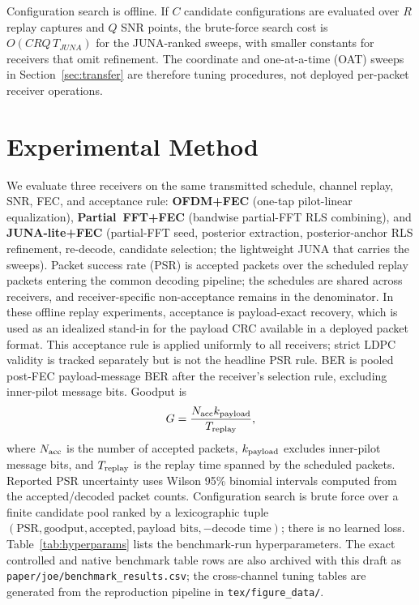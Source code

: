 \documentclass[journal]{IEEEtran}
\newcommand{\juna}{JUNA}
\newcommand{\junalite}{JUNA-lite}
\begin{document}
Configuration search is offline. If $C$ candidate configurations are evaluated
over $R$ replay captures and $Q$ SNR points, the brute-force search cost is
$O(CRQ\,T_{\juna})$ for the JUNA-ranked sweeps, with smaller constants for
receivers that omit refinement. The coordinate and one-at-a-time (OAT) sweeps in
Section~\ref{sec:transfer} are therefore tuning procedures, not deployed
per-packet receiver operations.

\section{Experimental Method}\label{sec:method}
We evaluate three receivers on the same transmitted schedule, channel replay, SNR,
FEC, and acceptance rule: \textbf{OFDM+FEC} (one-tap pilot-linear equalization),
\textbf{Partial~FFT+FEC} (bandwise partial-FFT RLS combining), and
\textbf{\junalite{}+FEC} (partial-FFT seed, posterior extraction,
posterior-anchor RLS refinement, re-decode, candidate selection; the lightweight
\juna{} that carries the sweeps). Packet success rate (PSR) is
accepted packets over the scheduled replay packets entering the common decoding
pipeline; the schedules are shared across receivers, and receiver-specific
non-acceptance remains in the denominator. In these offline replay experiments,
acceptance is payload-exact recovery, which is used as an idealized stand-in for
the payload CRC available in a deployed packet format. This acceptance rule is
applied uniformly to all receivers; strict LDPC validity is tracked separately but
is not the headline PSR rule. BER is pooled post-FEC payload-message BER after
the receiver's selection rule, excluding inner-pilot message bits. Goodput is
\begin{equation}
  G=\frac{N_{\rm acc}k_{\rm payload}}{T_{\rm replay}},
  \label{eq:goodput}
\end{equation}
where $N_{\rm acc}$ is the number of accepted packets, $k_{\rm payload}$ excludes
inner-pilot message bits, and $T_{\rm replay}$ is the replay time spanned by the
scheduled packets. Reported PSR uncertainty uses Wilson 95\% binomial intervals
computed from the accepted/decoded packet counts.
Configuration search is brute force over a finite candidate pool ranked by a
lexicographic tuple
$(\mathrm{PSR},\text{goodput},\text{accepted},\text{payload bits},
-\text{decode time})$; there is no learned loss. Table~\ref{tab:hyperparams}
lists the benchmark-run hyperparameters. The exact controlled and native
benchmark table rows are also archived with this draft as
\texttt{paper/joe/benchmark\_results.csv}; the cross-channel tuning tables are
generated from the reproduction pipeline in \texttt{tex/figure\_data/}.
\end{document}
